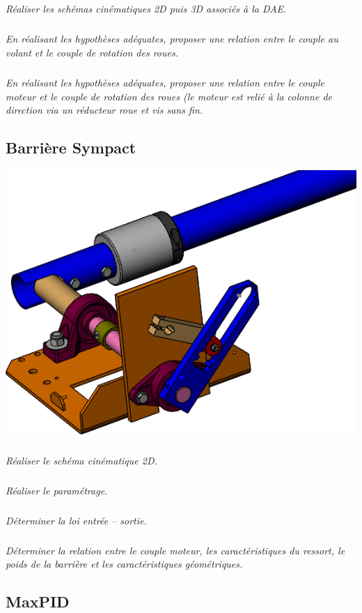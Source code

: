\documentclass[10pt,fleqn]{article} %
\begin{document}
\begin{multicols}{2}
\subparagraph{}
\textit{Réaliser les schémas cinématiques 2D puis 3D associés à la DAE.}

\subparagraph{}
\textit{En réalisant les hypothèses adéquates, proposer une relation entre le couple au volant et le couple de rotation des roues.}


\subparagraph{}
\textit{En réalisant les hypothèses adéquates, proposer une relation entre le couple moteur et le couple de rotation des roues (le moteur est relié à la colonne de direction via un réducteur roue et vis sans fin.}



\subsection*{Barrière Sympact}
\setcounter{exo}{0}
\begin{center}
\includegraphics[width=\linewidth]{images/sympact_01}
\end{center}

\subparagraph{}
\textit{Réaliser le schéma cinématique 2D.}

\subparagraph{}
\textit{Réaliser le paramétrage.}


\subparagraph{}
\textit{Déterminer la loi entrée -- sortie.}



\subparagraph{}
\textit{Déterminer la relation entre le couple moteur, les caractéristiques du ressort, le poids de la barrière et les caractéristiques géométriques. }


\subsection*{MaxPID}



\end{multicols}
\end{document}
